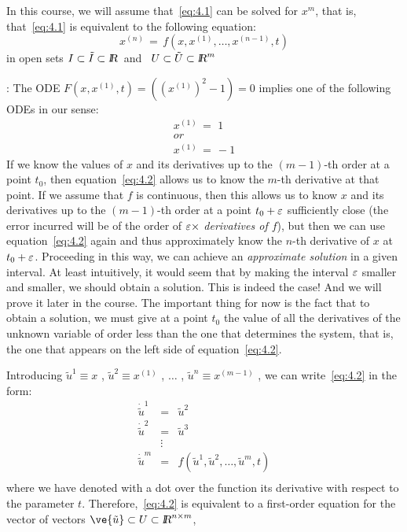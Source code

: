 In this course, we will assume that~\ref{eq:4.1} can be solved for $x^m$,
that is, that~\ref{eq:4.1} is equivalent to the following equation:
\begin{equation}
x^{(n)}\,=\,f(x,x^{(1)},\ldots,x^{(n-1)},t)       \label{eq:4.2}
\end{equation}
\noindent in open sets $I\subset\tilde I \subset \mbox{\sl {l$\!\!\!\;\:\!$R}}$\  and \ $U\subset
\tilde U \subset \mbox{\sl {l$\!\!\!\;\:\!$R}}^m$

\ejem: The ODE $F(x,x^{(1)},t)=((x^{(1)})^2 -1)=0 $ 
implies one of the following ODEs in our sense:
\begin{equation}
\begin{array}{l}
   x^{(1)}\,=\,\,1 \\ 
   or \\
   x^{(1)}\,=\,-1
\end{array}
\end{equation}
\espa
If we know the values of $x$ and its derivatives up to the $(m-1)$-th
order at a point $t_0$, then equation~\ref{eq:4.2} allows us to
know the $m$-th derivative at that point. 
If we assume that $f$ is continuous, then this allows us to know
$x$ and its derivatives up to the $(m-1)$-th order at a point $t_0+\mbox{$\varepsilon$}$
sufficiently close (the error incurred will be of the order
of $\mbox{$\varepsilon$} \times $ {\it derivatives of $f$}), but then we can use
equation~\ref{eq:4.2} again and thus approximately know
the $n$-th derivative of $x$ at $t_0 + \mbox{$\varepsilon$}$. Proceeding in this way,
we can achieve an {\it approximate solution} in a given interval.
At least intuitively, it would seem that by making the interval $\mbox{$\varepsilon$}$ smaller and smaller,
we should obtain a solution. This is indeed
the case! And we will prove it later in the course. The important
thing for now is the fact that to obtain a solution, we must
give at a point $t_0$ the value of all the derivatives of the unknown
variable of order less than the one that determines the system, that is, the one
that appears on the left side of equation~\ref{eq:4.2}.



\espa
Introducing $ \tilde{u}^1 \equiv x$ , $\tilde{u}^2\equiv x^{(1)}$ , $\ldots$ ,
$\tilde{u}^n \equiv x^{(m-1)}$ , we can write~\ref{eq:4.2} in the form:
\begin{equation}
\begin{array}{lcl}
   \dot{\tilde{u}}^1&=&\tilde{u}^2 \\
   \dot{\tilde{u}}^2&=&\tilde{u}^3 \\
           &\vdots&  \\
\dot{\tilde{u}}^m&=&f(\tilde{u}^1,\tilde{u}^2,\ldots,\tilde{u}^m,t)\\
   \end{array}
 \end{equation}
\noindent 
where we have denoted with a dot over the function its derivative with
respect to the parameter $t$. 
Therefore,~\ref{eq:4.2} is equivalent to a first-order equation for the vector of vectors 
$\ve{\tilde{u}} \subset U\subset \re^{n \times m}$,

